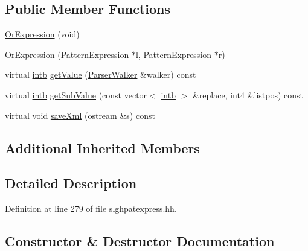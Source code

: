 \subsection*{Public Member Functions}
\begin{DoxyCompactItemize}
\item 
\mbox{\hyperlink{class_or_expression_a0e4dbb30c38dfcaf9de53a1aad00d0a3}{Or\+Expression}} (void)
\item 
\mbox{\hyperlink{class_or_expression_a43f637b66cbe898fb15f067c672aca25}{Or\+Expression}} (\mbox{\hyperlink{class_pattern_expression}{Pattern\+Expression}} $\ast$l, \mbox{\hyperlink{class_pattern_expression}{Pattern\+Expression}} $\ast$r)
\item 
virtual \mbox{\hyperlink{types_8h_aa925ba3e627c2df89d5b1cfe84fb8572}{intb}} \mbox{\hyperlink{class_or_expression_a48042c08d38b45e3f32e28953a25584b}{get\+Value}} (\mbox{\hyperlink{class_parser_walker}{Parser\+Walker}} \&walker) const
\item 
virtual \mbox{\hyperlink{types_8h_aa925ba3e627c2df89d5b1cfe84fb8572}{intb}} \mbox{\hyperlink{class_or_expression_af7c1fe52ac78b97d8bf36d4fa94877fd}{get\+Sub\+Value}} (const vector$<$ \mbox{\hyperlink{types_8h_aa925ba3e627c2df89d5b1cfe84fb8572}{intb}} $>$ \&replace, int4 \&listpos) const
\item 
virtual void \mbox{\hyperlink{class_or_expression_aab8268d75147e85ea9110a07e0add377}{save\+Xml}} (ostream \&s) const
\end{DoxyCompactItemize}
\subsection*{Additional Inherited Members}


\subsection{Detailed Description}


Definition at line 279 of file slghpatexpress.\+hh.



\subsection{Constructor \& Destructor Documentation}
\mbox{\label{class_or_expression_a0e4dbb30c38dfcaf9de53a1aad00d0a3}} 
